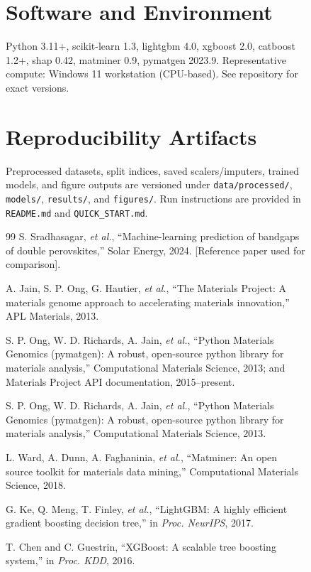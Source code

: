 \documentclass[conference]{IEEEtran}
\begin{document}
\begin{figure}[t!]
\section{Software and Environment}\label{app:env}
Python 3.11+, scikit-learn 1.3, lightgbm 4.0, xgboost 2.0, catboost 1.2+, shap 0.42, matminer 0.9, pymatgen 2023.9. Representative compute: Windows 11 workstation (CPU-based). See repository for exact versions.

\section{Reproducibility Artifacts}\label{app:repro}
Preprocessed datasets, split indices, saved scalers/imputers, trained models, and figure outputs are versioned under \texttt{data/processed/}, \texttt{models/}, \texttt{results/}, and \texttt{figures/}. Run instructions are provided in \texttt{README.md} and \texttt{QUICK\_START.md}.

\begin{thebibliography}{99}
S. Sradhasagar, \emph{et al.}, ``Machine-learning prediction of bandgaps of double perovskites,'' Solar Energy, 2024. [Reference paper used for comparison].

A. Jain, S. P. Ong, G. Hautier, \emph{et al.}, ``The Materials Project: A materials genome approach to accelerating materials innovation,'' APL Materials, 2013.

S. P. Ong, W. D. Richards, A. Jain, \emph{et al.}, ``Python Materials Genomics (pymatgen): A robust, open-source python library for materials analysis,'' Computational Materials Science, 2013; and Materials Project API documentation, 2015--present.

S. P. Ong, W. D. Richards, A. Jain, \emph{et al.}, ``Python Materials Genomics (pymatgen): A robust, open-source python library for materials analysis,'' Computational Materials Science, 2013.

L. Ward, A. Dunn, A. Faghaninia, \emph{et al.}, ``Matminer: An open source toolkit for materials data mining,'' Computational Materials Science, 2018.

G. Ke, Q. Meng, T. Finley, \emph{et al.}, ``LightGBM: A highly efficient gradient boosting decision tree,'' in \emph{Proc. NeurIPS}, 2017.

T. Chen and C. Guestrin, ``XGBoost: A scalable tree boosting system,'' in \emph{Proc. KDD}, 2016.


\end{thebibliography}
\end{figure}
\end{document}
